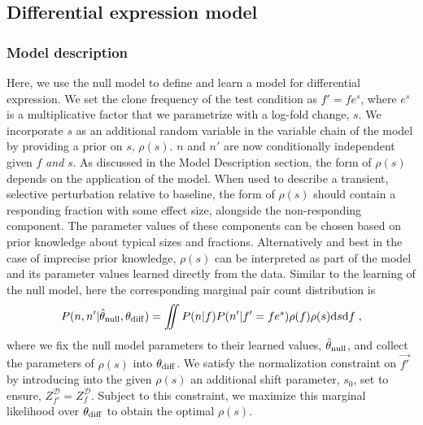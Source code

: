 \documentclass[letterpaper,english,prl,reprint,longbibliography]{revtex4-1} %
\begin{document}
\subsection*{Differential expression model}

\subsubsection*{Model description}
Here, we use the null model to define and learn a model for differential expression. 
We set the clone frequency of the test condition as $f'=fe^s$, where $e^s$ is a multiplicative factor that we parametrize with a log-fold change, $s$. 
We incorporate $s$ as an additional random variable in the variable chain of the model by providing a prior on $s$, $\rho(s)$. 
$n$ and $n'$ are now conditionally independent given $f$ \textit{and} $s$.
As discussed in the Model Description section, the form of $\rho(s)$ depends on the application of the model. 
When used to describe a transient, selective perturbation relative to baseline, the form of $\rho(s)$ should contain a responding fraction with some effect size, alongside the non-responding component. 
The parameter values of these components can be chosen based on prior knowledge about typical sizes and fractions. 
Alternatively and best in the case of imprecise prior knowledge, $\rho(s)$ can be interpreted as part of the model and its parameter values learned directly from the data. 
Similar to the learning of the null model, here the corresponding marginal pair count distribution is 
\begin{equation}
    \begin{split}
	P(n,n'|\hat{\theta}_{\textrm{\textrm{null}}},\theta_{\textrm{\textrm{diff}}})=\iint P(n|f)P(n'|f'=fe^s)\rho(f)\rho(s)\text{d}s\text{d}f\;,
	\end{split}
\end{equation}
where we fix the null model parameters to their learned values, $\hat{\theta}_{\textrm{\textrm{null}}}$, and collect the parameters of $\rho(s)$ into $\theta_{\textrm{\textrm{diff}}}$. 
We satisfy the normalization constraint on $\vec{f'}$ by introducing into the given $\rho(s)$ an additional shift parameter, $s_0$, set to ensure, $Z^\mathcal{D}_{f'}=Z^\mathcal{D}_f$.
Subject to this constraint, we maximize this marginal likelihood over $\theta_{\textrm{\textrm{diff}}}$ to obtain the optimal $\rho(s)$. 
\end{document}
